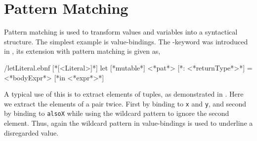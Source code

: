 \documentclass[fsharpNotes.tex]{subfiles}
\begin{document}
\chapter{Pattern Matching}
\label{chap:patterns}


Pattern matching is used to transform values and variables into a syntactical structure. The simplest example is value-bindings. The -keyword was introduced in , its extension with pattern matching is given as,
%
\begin{verbatimwrite}{\ebnf/letLiteral.ebnf}
[*[<Literal>]*]
let [*mutable*] <*pat*> [*: <*returnType*>*] = <*bodyExpr*> [*in <*expr*>*]
\end{verbatimwrite}
%
A typical use of this is to extract elements of tuples, as demonstrated in .
%
%
Here we extract the elements of a pair twice. First by binding to \lstinline{x} and \lstinline{y}, and second by binding to \lstinline{alsoX} while using the wildcard pattern to ignore the second element. Thus, again the wildcard pattern in value-bindings is used to underline a disregarded value.
\end{document}
